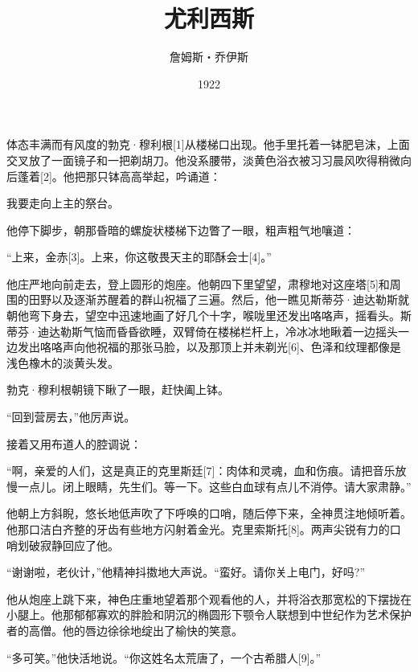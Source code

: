 \documentclass{article}
\title{尤利西斯}
\author{詹姆斯・乔伊斯}
\date{1922}
\begin{document}



\Large

体态丰满而有风度的勃克·穆利根[1]从楼梯口出现。他手里托着一钵肥皂沫，上面交叉放了一面镜子和一把剃胡刀。他没系腰带，淡黄色浴衣被习习晨风吹得稍微向后蓬着[2]。他把那只钵高高举起，吟诵道：



我要走向上主的祭台。



他停下脚步，朝那昏暗的螺旋状楼梯下边瞥了一眼，粗声粗气地嚷道：



“上来，金赤[3]。上来，你这敬畏天主的耶酥会士[4]。”



他庄严地向前走去，登上圆形的炮座。他朝四下里望望，肃穆地对这座塔[5]和周围的田野以及逐渐苏醒着的群山祝福了三遍。然后，他一瞧见斯蒂芬·迪达勒斯就朝他弯下身去，望空中迅速地画了好几个十字，喉咙里还发出咯咯声，摇看头。斯蒂芬·迪达勒斯气恼而昏昏欲睡，双臂倚在楼梯栏杆上，冷冰冰地瞅着一边摇头一边发出咯咯声向他祝福的那张马脸，以及那顶上并未剃光[6]、色泽和纹理都像是浅色橡木的淡黄头发。



勃克·穆利根朝镜下瞅了一眼，赶快阖上钵。



“回到营房去，”他厉声说。



接着又用布道人的腔调说：



“啊，亲爱的人们，这是真正的克里斯廷[7]：肉体和灵魂，血和伤痕。请把音乐放慢一点儿。闭上眼睛，先生们。等一下。这些白血球有点儿不消停。请大家肃静。”



他朝上方斜睨，悠长地低声吹了下呼唤的口哨，随后停下来，全神贯注地倾听着。他那口洁白齐整的牙齿有些地方闪射着金光。克里索斯托[8]。两声尖锐有力的口哨划破寂静回应了他。



“谢谢啦，老伙计，”他精神抖擞地大声说。“蛮好。请你关上电门，好吗?”



他从炮座上跳下来，神色庄重地望着那个观看他的人，并将浴衣那宽松的下摆拢在小腿上。他那郁郁寡欢的胖脸和阴沉的椭圆形下颚令人联想到中世纪作为艺术保护者的高僧。他的唇边徐徐地绽出了榆快的笑意。



“多可笑。”他快活地说。“你这姓名太荒唐了，一个古希腊人[9]。”
\end{document}
